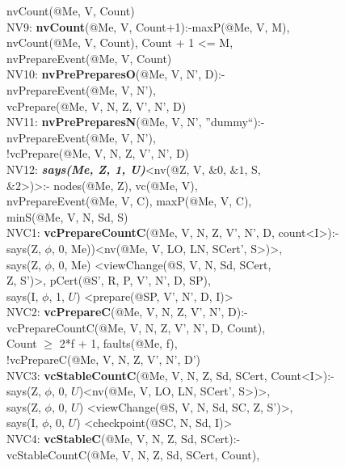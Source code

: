 \begin{code}
\> nvCount(@Me, V, Count)\\
NV9: \textbf{nvCount}(@Me, V, Count+1):-maxP(@Me, V, M), \\
\> nvCount(@Me, V, Count), Count + 1 <= M, \\
\> nvPrepareEvent(@Me, V, Count)\\
NV10: \textbf{nvPrePreparesO}(@Me, V, N', D):-\\
\> nvPrepareEvent(@Me, V, N'), \\
\> vcPrepare(@Me, V, N, Z, V', N', D)\\
NV11: \textbf{nvPrePreparesN}(@Me, V, N', ''dummy``):-\\
\> nvPrepareEvent(@Me, V, N'), \\
\> !vcPrepare(@Me, V, N, Z, V', N', D)\\
NV12: \textbf{\textit{says(Me, Z, 1, U)}}<nv(@Z, V, $\&0$, $\&1$, S, \\
\> $\&2$>)>:- nodes(@Me, Z), vc(@Me, V), \\
\> nvPrepareEvent(@Me, V, C), maxP(@Me, V, C), \\
\> minS(@Me, V, N, Sd, S)\\
NVC1: \textbf{vcPrepareCountC}(@Me, V, N, Z, V', N', D, count<I>):-\\
\> says(Z, $\phi$, 0, Me))<nv(@Me, V, LO, LN, SCert', S>)>,\\
\> says(Z, $\phi$, 0, Me) <viewChange(@S, V, N, Sd, SCert, \\
\> Z, S')>, pCert(@S', R, P, V', N', D, SP),\\
\> says(I, $\phi$, 1, $U$) <prepare(@SP, V', N', D, I)>\\
NVC2: \textbf{vcPrepareC}(@Me, V, N, Z, V', N', D):-\\
\> vcPrepareCountC(@Me, V, N, Z, V', N', D, Count),\\
\> Count $\geq$ 2*f + 1, faults(@Me, f),\\
\> !vcPrepareC(@Me, V, N, Z, V', N', D')\\
NVC3: \textbf{vcStableCountC}(@Me, V, N, Z, Sd, SCert, Count<I>):- \\
\> says(Z, $\phi$, 0, $U$)<nv(@Me, V, LO, LN, SCert', S>)>,\\
\> says(Z, $\phi$, 0, $U$) <viewChange(@S, V, N, Sd, SC, Z, S')>,\\
\> says(I, $\phi$, 0, $U$) <checkpoint(@SC, N, Sd, I)>\\
NVC4: \textbf{vcStableC}(@Me, V, N, Z, Sd, SCert):-\\
\> vcStableCountC(@Me, V, N, Z, Sd, SCert, Count),\\

\end{code}
